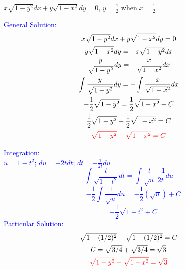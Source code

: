 \item $x\sqrt{1-y^2}dx+y\sqrt{1-x^2}dy=0$, $y = \frac{1}{2}$ when $x = \frac{1}{2}$
    
    \textcolor{blue}{
    \begin{minipage}[t]{0.45\textwidth}
        General Solution:
        \begin{gather*}
            x\sqrt{1-y^2}dx+y\sqrt{1-x^2}dy = 0 \\
            y\sqrt{1-x^2}dy = -x\sqrt{1-y^2}dx \\
            \frac{y}{\sqrt{1-y^2}}dy = -\frac{x}{\sqrt{1-x^2}}dx \\
            \int\frac{y}{\sqrt{1-y^2}}dy = -\int\frac{x}{\sqrt{1-x^2}}dx \\
            -\frac{1}{2}\sqrt{1-y^2} = \frac{1}{2}\sqrt{1-x^2}+C \\
            \frac{1}{2}\sqrt{1-y^2} + \frac{1}{2}\sqrt{1-x^2} = C \\
            \textcolor{red}{
            \sqrt{1-y^2} + \sqrt{1-x^2} = C   
            }
        \end{gather*}
    \end{minipage}
    \hfill
    \begin{minipage}[t]{0.45\textwidth}
        Integration:\\
            $u = 1-t^2$; $du = -2tdt$; $dt = -\frac{1}{2t}du$      
        \[
            \int\frac{t}{\sqrt{1-t^2}}dt =\int\frac{t}{\sqrt{u}}\frac{-1}{2t}du
        \]
        \[
            =-\frac{1}{2}\int\frac{1}{\sqrt{u}}du
            = -\frac{1}{2}(\sqrt{u})+C
        \]
        \[= -\frac{1}{2}\sqrt{1-t^2}+C\]
        Particular Solution:
        \begin{gather*}
            \sqrt{1-(1/2)^2} + \sqrt{1-(1/2)^2} = C \\
            C = \sqrt{3/4}+\sqrt{3/4} = \sqrt3 \\
            \textcolor{red}{
            \sqrt{1-y^2} + \sqrt{1-x^2} = \sqrt3
            }
        \end{gather*}
    \end{minipage}
    }